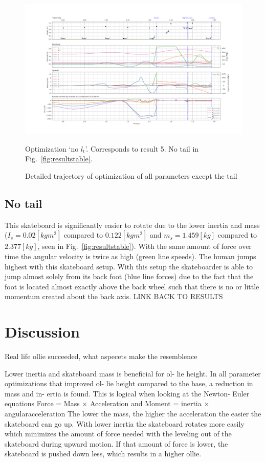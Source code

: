 \documentclass[default,iicol]{sn-jnl}
\begin{document}
\begin{figure}[t]
    \includegraphics[trim={0cm 0cm 0cm 0cm},clip,width=\textwidth]{figure/Results/data_no_taildpi600.png}
    \caption[Trajectory, positions, speeds, and forces for `all except tail length' optimization]{Detailed trajectory of optimization of all parameters except the tail}\label{f_notail}
    Optimization `no $l_t$'. Corresponds to result 5. No tail in Fig.~\ref{fig:resultstable}.
    
\end{figure}

\subsection{No tail}
This skateboard is significantly easier to rotate due to the lower inertia and mass ($I_s = 0.02 [kg m^2]$ compared to $0.122 [kg m^2]$ and $m_s = 1.459 [kg]$ compared to $2.377 [kg]$, seen in Fig.~\ref{fig:resultstable}). With the same amount of force over time the angular velocity is twice as high (green line speeds). The human jumps highest with this skateboard setup. With this setup the skateboarder is able to jump almost solely from its back foot (blue line forces) due to the fact that the foot is located almost exactly above the back wheel such that there is no or little momentum created about the back axis. 
LINK BACK TO RESULTS


\section{Discussion}
Real life ollie succeeded, what aspecets make the resemblence

Lower inertia and skateboard mass is beneficial for ol- lie height. In all parameter optimizations that improved ol- lie height compared to the base, a reduction in mass and in- ertia is found. This is logical when looking at the Newton- Euler equations Force = Mass × Acceleration and Moment = inertia × angularacceleration The lower the mass, the higher the acceleration the easier the skateboard can go up. With lower inertia the skateboard rotates more easily which minimizes the amount of force needed with the leveling out of the skateboard during upward motion. If that amount of force is lower, the skateboard is pushed down less, which results in a higher ollie. 
\end{document}
